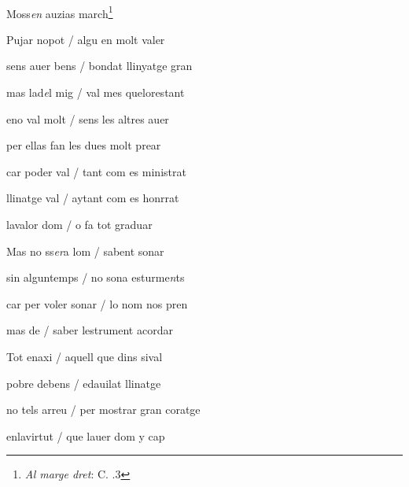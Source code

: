 \documentclass[12pt]{article}
\renewcommand{\espaiAbansEtiquetaPoema}{\vspace{0ex}}
\begin{document}
\begin{estrofa}

\espaiAbansEtiquetaPoema

\\

\begin{rubrica}

\pagina{[139v]} Moss\textit{en} auzias march\footnote{\textit{Al marge dret}: C.
.3}

\end{rubrica}

\end{estrofa}


\begin{estrofa}

 Pujar nopot / algu en molt valer

 sens auer bens / bondat llinyatge gran

 mas lad\textit{e}l mig / val mes quelorestant

 eno val molt / sens les altres auer

 per ellas fan les dues molt prear

 car poder val / tant com es ministrat

 llinatge val / aytant com es honrrat

 lavalor dom / o fa tot graduar

\end{estrofa}



\begin{estrofa}

 Mas no ss\textit{er}a lom / sabent sonar

 sin alguntemps / no sona esturme\textit{n}ts

 car per voler sonar / lo nom nos pren

 mas de  / saber lestrument
acordar

 Tot enaxi / aquell que dins sival

 pobre debens / edauilat llinatge

 no tels arreu / per mostrar gran coratge

 enlavirtut / que lauer dom y cap

\end{estrofa}
\end{document}
